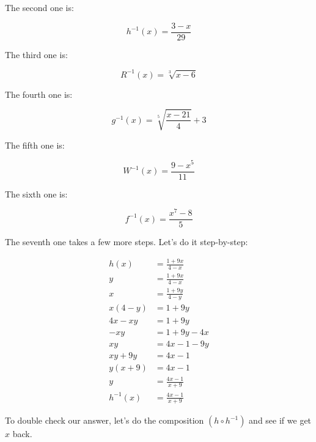 \documentclass[12pt]{article}
\begin{document}
The second one is:

\begin{equation}
    h^{-1}(x) = \frac{3-x}{29}
\end{equation}

The third one is:

\begin{equation}
    R^{-1}(x) = \sqrt[3]{x-6}
\end{equation}

The fourth one is:

\begin{equation}
    g^{-1}(x) = \sqrt[5]{\frac{x-21}{4}}+3
\end{equation}

The fifth one is:

\begin{equation}
    W^{-1}(x) = \frac{9-x^5}{11}
\end{equation}

The sixth one is:

\begin{equation}
    f^{-1}(x) = \frac{x^7-8}{5}
\end{equation}

The seventh one takes a few more steps.
Let's do it step-by-step:

\begin{align}
    h(x)      & = \frac{1+9x}{4-x} \\
    y         & = \frac{1+9x}{4-x} \\
    x         & = \frac{1+9y}{4-y} \\
    x(4-y)    & = 1+9y             \\
    4x - xy   & = 1+9y             \\
    -xy       & = 1+9y-4x          \\
    xy        & = 4x-1-9y          \\
    xy+9y     & = 4x-1             \\
    y(x+9)    & = 4x-1             \\
    y         & = \frac{4x-1}{x+9} \\
    h^{-1}(x) & = \frac{4x-1}{x+9}
\end{align}

To double check our answer, let's do the composition $(h \circ h^{-1})$ and see if we get $x$ back.
\end{document}
